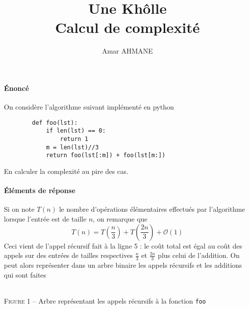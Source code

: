 \documentclass[17pt]{article}
\title{Une Khôlle\\ Calcul de complexité}
\author{Amar AHMANE}
\newcommand{\f}[1]{\texttt{#1}}
\begin{document}
	\maketitle
	\paragraph*{Énoncé} On considère l'algorithme suivant implémenté en python
	\begin{lstlisting}
		def foo(lst):
			if len(lst) == 0:
				return 1
			m = len(lst)//3
			return foo(lst[:m]) + foo(lst[m:])
	\end{lstlisting}
	En calculer la complexité au pire des cas.
	\paragraph*{Éléments de réponse} Si on note $T(n)$ le nombre d'opérations élémentaires effectués par l'algorithme lorsque l'entrée est de taille $n$, on remarque que \[T(n)=T\left(\frac n3\right)+T\left(\frac{2n}3\right)+\mathcal O(1)\]
	Ceci vient de l'appel récursif fait à la ligne 5 : le coût total est égal au coût des appels sur des entrées de tailles respectives $\frac n3$ et $\frac{2n}3$ plus celui de l'addition. On peut alors représenter dans un arbre binaire les appels récursifs et les additions qui sont faites
	\begin{center}
		\\
		\textsc{Figure 1} – Arbre représentant les appels récursifs à la fonction \f{foo}
	\end{center} 
\end{document}

